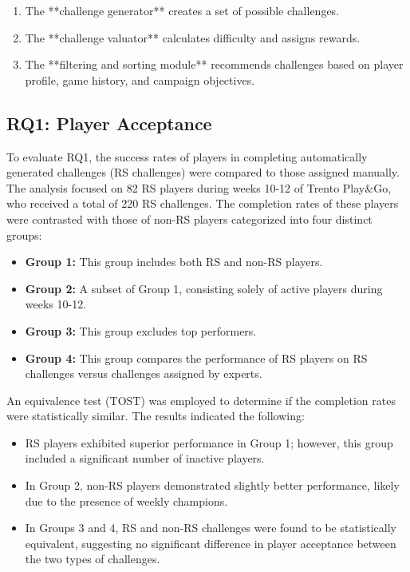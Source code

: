 \begin{enumerate}
    \item The **challenge generator** creates a set of possible challenges.
    \item The **challenge valuator** calculates difficulty and assigns rewards.
    \item The **filtering and sorting module** recommends challenges based on player profile, game history, and campaign objectives.
\end{enumerate}

\subsection{RQ1: Player Acceptance}

To evaluate RQ1, the success rates of players in completing automatically generated challenges (RS challenges) were compared to those assigned manually. The analysis focused on 82 RS players during weeks 10-12 of Trento Play\&Go, who received a total of 220 RS challenges. The completion rates of these players were contrasted with those of non-RS players categorized into four distinct groups:

\begin{itemize}
    \item \textbf{Group 1:} This group includes both RS and non-RS players.
    \item \textbf{Group 2:} A subset of Group 1, consisting solely of active players during weeks 10-12.
    \item \textbf{Group 3:} This group excludes top performers.
    \item \textbf{Group 4:} This group compares the performance of RS players on RS challenges versus challenges assigned by experts.
\end{itemize}

An equivalence test (TOST) was employed to determine if the completion rates were statistically similar. The results indicated the following:

\begin{itemize}
    \item RS players exhibited superior performance in Group 1; however, this group included a significant number of inactive players.
    \item In Group 2, non-RS players demonstrated slightly better performance, likely due to the presence of weekly champions.
    \item In Groups 3 and 4, RS and non-RS challenges were found to be statistically equivalent, suggesting no significant difference in player acceptance between the two types of challenges.
\end{itemize}

